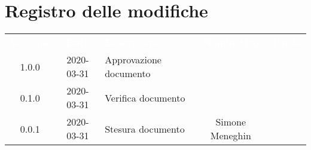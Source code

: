 \section*{Registro delle modifiche}
{
	\centering
	\begin{longtable}{ c c  C{4cm}  c  c }
		\textcolor{white}{\textbf{Versione}} & \textcolor{white}{\textbf{Data}} & \textcolor{white}{\textbf{Descrizione}} & \textcolor{white}{\textbf{Nominativo}} & \textcolor{white}{\textbf{Ruolo}}\\	
		1.0.0 & 2020-03-31 & Approvazione documento &  &\RdP{}\\	
		0.1.0 & 2020-03-31 & Verifica documento &  &\ver{}\\		
		0.0.1 & 2020-03-31 & Stesura documento & Simone Meneghin &\reda{}\\		
		
	\end{longtable}

}